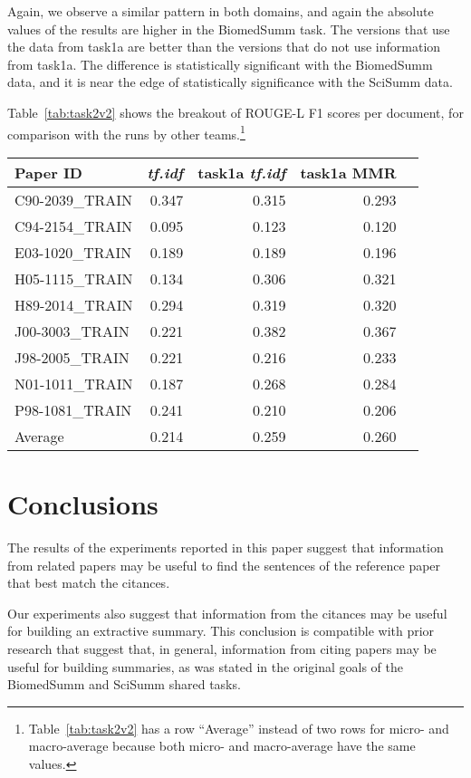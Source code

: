 \documentclass[11pt]{article}
\begin{document}
Again, we observe a similar pattern in both domains, and again the
absolute values of the results are higher in the BiomedSumm task. The
versions that use the data from task1a are better than the versions
that do not use information from task1a. The difference is
statistically significant with the BiomedSumm data, and it is near the
edge of statistically significance with the SciSumm data.

Table~\ref{tab:task2v2} shows the breakout of ROUGE-L F1 scores per
document, for comparison with the runs by other
teams.\footnote{Table~\ref{tab:task2v2} has a row ``Average'' instead
  of two rows for micro- and macro-average because both micro- and
  macro-average have the same values.}

\begin{table*}
  \centering
  \begin{tabular}{l|r|rrr}
Paper ID & \emph{tf.idf} & task1a \emph{tf.idf}  & task1a MMR\\
\hline
C90-2039\_TRAIN & 0.347 & 0.315 & 0.293\\
C94-2154\_TRAIN & 0.095 & 0.123 & 0.120\\
E03-1020\_TRAIN & 0.189 & 0.189 & 0.196\\
H05-1115\_TRAIN & 0.134 & 0.306 & 0.321\\
H89-2014\_TRAIN & 0.294 & 0.319 & 0.320\\
J00-3003\_TRAIN & 0.221 & 0.382 & 0.367\\
J98-2005\_TRAIN & 0.221 & 0.216 & 0.233\\
N01-1011\_TRAIN & 0.187 & 0.268 & 0.284\\
P98-1081\_TRAIN & 0.241 & 0.210 & 0.206\\
\hline
Average & 0.214 & 0.259 & 0.260
  \end{tabular}
  \caption{ROUGE-L F1 results for individual SciSumm reference papers for task
  2}
  \label{tab:task2v2}
\end{table*}

\section{Conclusions}

The results of the experiments reported in this paper suggest that
information from related papers may be useful to find the sentences of the
reference paper that best match the citances. 

Our experiments also suggest that information from the citances may be
useful for building an extractive summary. This conclusion is
compatible with prior research that suggest that, in general,
information from citing papers may be useful for building summaries,
as was stated in the original goals of the BiomedSumm and SciSumm
shared tasks.
\end{document}
